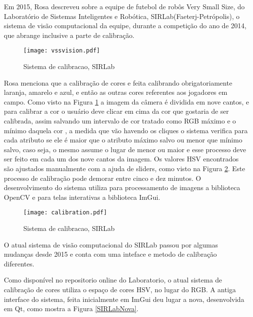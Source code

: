 Em 2015, Rosa\cite{Rosa:2015} descreveu sobre a equipe de futebol de rob\^os Very Small Size, do Laboratório de Sistemas Inteligentes e Robótica, SIRLab(Faeterj-Petrópolis), o sistema de visão computacional da equipe, durante a competição do ano de 2014, que abrange inclusive a parte de calibração. 

\begin{figure}[H]
	\centering
	\texttt{[image: vssvision.pdf]} 	
	\caption{Sistema de calibracao, SIRLab\cite{Rosa:2015}}
	\label{SIRLabCalibracao}
\end{figure}
Rosa menciona que a calibração de cores e feita calibrando obrigatoriamente laranja, amarelo e azul, e então as outras cores referentes aos jogadores em campo. Como visto na Figura \ref{SIRLabCalibracao} a imagem da c\^amera é dividida em nove cantos, e para calibrar a cor o usuário deve clicar em cima da cor que gostaria de ser calibrada, assim salvando um intervalo de cor tratado como RGB máximo e o mínimo daquela cor , a medida
que vão havendo os cliques o sistema verifica para cada atributo se ele é maior que o atributo
máximo salvo ou menor que mínimo salvo, caso seja, o mesmo assume o lugar de menor ou
maior\cite{Rosa:2015} e esse processo deve ser feito em cada um dos nove cantos da imagem. Os valores HSV encontrados s\~ao ajustados manualmente com a ajuda de sliders, como visto na Figura \ref{SIRLabCalibracaoHSV}. Este processo de calibração pode demorar entre cinco e dez minutos.
O desenvolvimento do sistema utiliza para processamento de imagens a biblioteca OpenCV e para telas interativas a biblioteca  ImGui.

\begin{figure}[!h]
	\centering
	\texttt{[image: calibration.pdf]} 	
	\caption{Sistema de calibracao, SIRLab\cite{VSSVision}}
	\label{SIRLabCalibracaoHSV}
\end{figure}

O atual sistema de visão computacional do SIRLab passou por algumas mudanças desde 2015 e conta com uma inteface e metodo de calibração diferentes\cite{VSSVision}. 

Como disponível no repositorio online do Laboratorio, o atual sistema de calibração de cores utiliza o espaço de cores HSV, no lugar do RGB\cite{Rosa:2015}. A antiga interface do sistema, feita inicialmente em ImGui deu lugar a nova, desenvolvida em Qt, como mostra a Figura \ref{SIRLabNova}.

